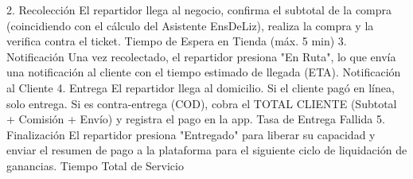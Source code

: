2. Recolección El repartidor llega al negocio, confirma el subtotal de la compra (coincidiendo con el cálculo del Asistente EnsDeLiz), realiza la compra y la verifica contra el ticket. Tiempo de Espera en Tienda (máx. 5 min)
3. Notificación Una vez recolectado, el repartidor presiona "En Ruta", lo que envía una notificación al cliente con el tiempo estimado de llegada (ETA). Notificación al Cliente
4. Entrega El repartidor llega al domicilio. Si el cliente pagó en línea, solo entrega. Si es contra-entrega (COD), cobra el TOTAL CLIENTE (Subtotal + Comisión + Envío) y registra el pago en la app. Tasa de Entrega Fallida
5. Finalización El repartidor presiona "Entregado" para liberar su capacidad y enviar el resumen de pago a la plataforma para el siguiente ciclo de liquidación de ganancias. Tiempo Total de Servicio

